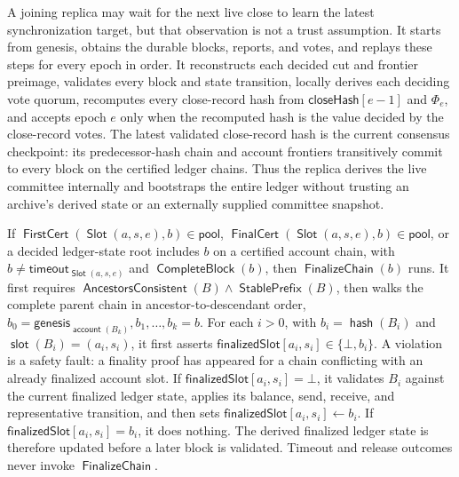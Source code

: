 \documentclass[sigplan,twocolumn,review,anonymous]{acmart}
\newcommand{\func}[1]{\operatorname{\mathsf{#1}}}
\newcommand{\hash}{\func{hash}}
\newcommand{\FirstCert}{\func{FirstCert}}
\newcommand{\FinalCert}{\func{FinalCert}}
\newcommand{\Slot}{\func{Slot}}
\newcommand{\CompleteBlock}{\func{CompleteBlock}}
\newcommand{\timeoutVal}{\mathsf{timeout}}
\newcommand{\accountOf}{\func{account}}
\newcommand{\closeHash}{\mathsf{closeHash}}
\newcommand{\slotOf}{\func{slot}}
\newcommand{\finalizedSlot}{\mathsf{finalizedSlot}}
\newcommand{\FinalizeChain}{\func{FinalizeChain}}
\newcommand{\StablePrefix}{\func{StablePrefix}}
\begin{document}
A joining replica may wait for the next live close to learn the latest synchronization target, but that
observation is not a trust assumption.  It starts from genesis, obtains the durable blocks, reports, and
votes, and replays these steps for every epoch in order.  It reconstructs each decided cut and frontier
preimage, validates every block and state transition, locally derives each deciding vote quorum,
recomputes every close-record hash from \(\closeHash[e-1]\) and \(\Phi_e\), and accepts epoch \(e\)
only when the recomputed hash is the value decided by the close-record votes.  The latest validated
close-record hash is the current consensus checkpoint: its predecessor-hash chain and account
frontiers transitively commit to every block on the certified ledger chains.  Thus the replica derives
the live committee internally and bootstraps the entire ledger without trusting an archive's derived
state or an externally supplied committee snapshot.

If \(\FirstCert(\Slot(a,s,e),b)\in\mathsf{pool}\),
\(\FinalCert(\Slot(a,s,e),b)\in\mathsf{pool}\), or a decided ledger-state root includes \(b\) on a
certified account chain, with \(b\neq\timeoutVal_{\Slot(a,s,e)}\) and \(\CompleteBlock(b)\), then
\(\FinalizeChain(b)\) runs.  It first requires
\(\func{AncestorsConsistent}(B)\wedge\StablePrefix(B)\), then walks the complete parent chain in
ancestor-to-descendant order, \(b_0=\mathsf{genesis}_{\accountOf(B_k)},b_1,\ldots,b_k=b\).  For each
\(i>0\), with \(b_i=\hash(B_i)\) and \(\slotOf(B_i)=(a_i,s_i)\), it first asserts
\(\finalizedSlot[a_i,s_i]\in\{\bot,b_i\}\).  A violation is a safety fault: a finality proof has appeared
for a chain conflicting with an already finalized account slot.  If \(\finalizedSlot[a_i,s_i]=\bot\),
it validates \(B_i\) against the current finalized ledger state, applies its balance, send, receive, and
representative transition, and then sets \(\finalizedSlot[a_i,s_i]\gets b_i\).  If
\(\finalizedSlot[a_i,s_i]=b_i\), it does nothing.  The derived finalized ledger state is therefore
updated before a later block is validated.  Timeout and release outcomes never invoke
\(\FinalizeChain\).
\end{document}
